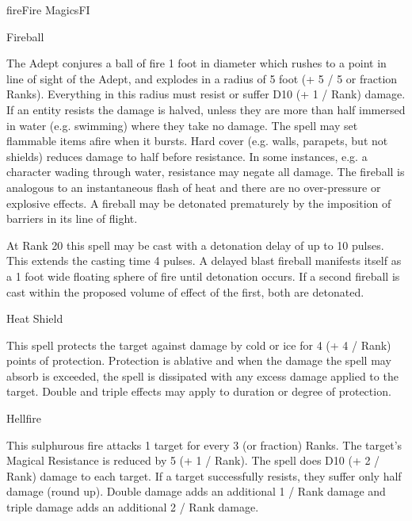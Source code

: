 \begin{College}[2.0]{fire}{Fire Magics}{FI}
\begin{spell}[S-4]{Fireball}

\begin{effects}
The Adept conjures a ball of fire 1 foot in diameter which rushes to a
point in line of sight of the Adept, and explodes in a radius of 5
foot (+ 5 / 5 or fraction Ranks). Everything in this radius must
resist or suffer D10 (+ 1 / Rank) damage.  If an entity resists the
damage is halved, unless they are more than half immersed in water
(e.g. swimming) where they take no damage.  The spell may set
flammable items afire when it bursts.  Hard cover (e.g. walls,
parapets, but not shields) reduces damage to half before resistance.
In some instances, e.g.  a character wading through water, resistance
may negate all damage. The fireball is analogous to an instantaneous
flash of heat and there are no over-pressure or explosive effects.  A
fireball may be detonated prematurely by the imposition of barriers in
its line of flight.

At Rank 20 this spell may be cast with a detonation delay of up to 10
pulses.  This extends the casting time 4 pulses.  A delayed blast
fireball manifests itself as a 1 foot wide floating sphere of fire
until detonation occurs. If a second fireball is cast within the
proposed volume of effect of the first, both are detonated.
\end{effects}
\end{spell}

\begin{spell}[S-5]{Heat Shield}

\begin{effects}
This spell protects the target against damage by cold or ice for 4 (+
4 / Rank) points of protection.  Protection is ablative and when the
damage the spell may absorb is exceeded, the spell is dissipated with
any excess damage applied to the target. Double and triple effects may
apply to duration or degree of protection.
\end{effects}
\end{spell}

\begin{spell}[S-6]{Hellfire}

\begin{effects}
This sulphurous fire attacks 1 target for every 3 (or fraction) Ranks.
The target’s Magical Resistance is reduced by 5 (+ 1 / Rank). The
spell does D10 (+ 2 / Rank) damage to each target.  If a target
successfully resists, they suffer only half damage (round up).  Double
damage adds an additional 1 / Rank damage and triple damage adds an
additional 2 / Rank damage.
\end{effects}
\end{spell}


\end{College}
